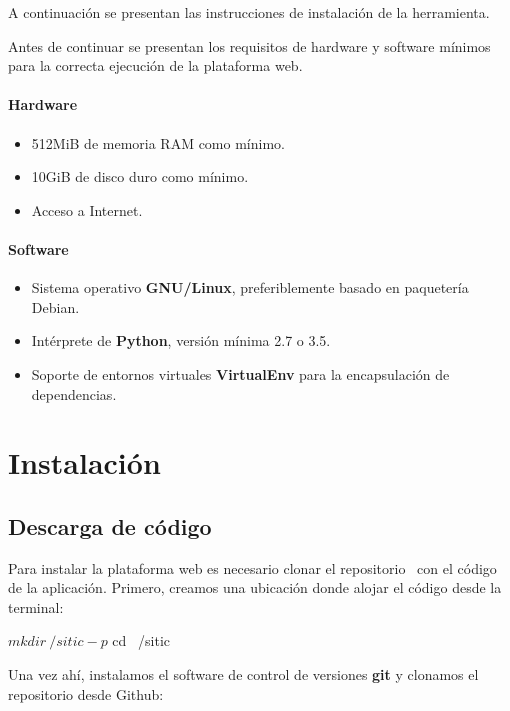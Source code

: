 A continuación se presentan las instrucciones de instalación de la herramienta.

Antes de continuar se presentan los requisitos de hardware y software mínimos
para la correcta ejecución de la plataforma web.

\paragraph{Hardware}

\begin{itemize}
\item 512MiB de memoria RAM como mínimo.
\item 10GiB de disco duro como mínimo.
\item Acceso a Internet.
\end{itemize}

\paragraph{Software}

\begin{itemize}
\item Sistema operativo \textbf{GNU/Linux}, preferiblemente basado en paquetería Debian.
\item Intérprete de \textbf{Python}, versión mínima 2.7 o 3.5.
\item Soporte de entornos virtuales \textbf{VirtualEnv} para la encapsulación de dependencias.
\end{itemize}

\section{Instalación}

\subsection{Descarga de código}

Para instalar la plataforma web es necesario clonar el repositorio~\cite{repositorio}
con el código de la aplicación. Primero, creamos una ubicación donde alojar el
código desde la terminal:

\begin{bashcode}
    $ mkdir ~/sitic -p
    $ cd ~/sitic
\end{bashcode}

Una vez ahí, instalamos el software de control de versiones \textbf{git} y
clonamos el repositorio desde Github:

